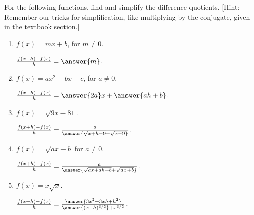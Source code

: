 \documentclass{ximera}
\author{Elizabeth Campolongo}
\begin{document}
\begin{exercise}
For the following functions,
find and simplify the difference quotients. [Hint: Remember our tricks for simplification, like multiplying by the conjugate, given in the textbook section.]

\begin{enumerate}
\item $f(x)= mx + b$, for $m \neq 0$.

$\frac{f(x+h)-f(x)}{h} = \answer{m}$.  

\item $f(x)= ax^2 + bx+c$, for $a \neq 0$.

$\frac{f(x+h)-f(x)}{h} = \answer{2a}x + \answer{ah +b}$.  


\item $f(x)= \sqrt{9x-81}$.

$\frac{f(x+h)-f(x)}{h} = \frac{3}{\answer{\sqrt{x+h-9} + \sqrt{x-9}}}$.  

\item $f(x)= \sqrt{ax+b}$ for $a \neq 0$.

$\frac{f(x+h)-f(x)}{h} = \frac{a}{\answer{\sqrt{ax+ah+b} + \sqrt{ax+b}}}$.  

\item $f(x)= x\sqrt{x}$.

$\frac{f(x+h)-f(x)}{h} = \frac{\answer{3x^2+3xh+h^2}}{\answer{(x+h)^{3/2}} +x^{3/2}}$.  



\end{enumerate}
\end{exercise}
\end{document}
